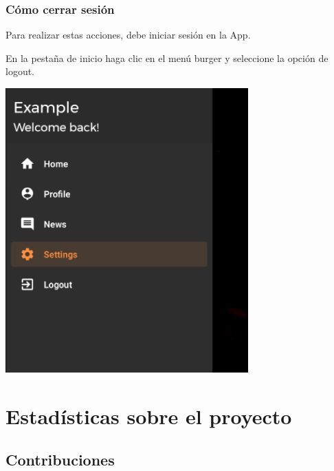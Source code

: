 \documentclass[12pt,a4paper]{article}
\begin{document}
\begin{enumerate}
\end{enumerate}


\subsubsection{Cómo cerrar sesión}

\begin{enumerate}
\item Para realizar estas acciones, debe iniciar sesión en la App.

\begin{minipage}{.60\textwidth}
  \item En la pestaña de inicio haga clic en el menú burger y seleccione la opción de logout.
\end{minipage}
\begin{minipage}{.40\textwidth}
  \includegraphics[width=0.7\textwidth, right]{selecionasettings}
\end{minipage}

\end{enumerate}




\newpage

\section{Estadísticas sobre el proyecto}

\subsection{Contribuciones}
\end{document}
